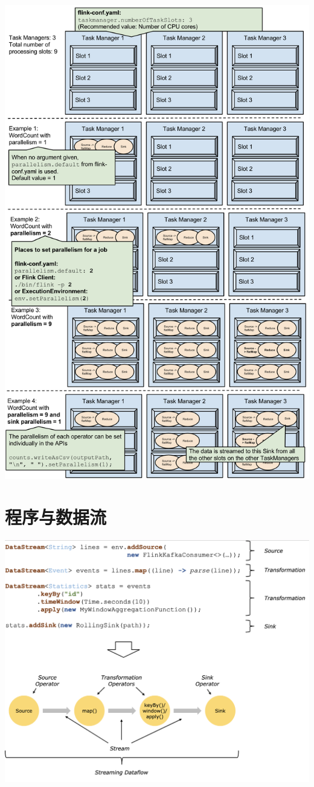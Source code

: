 \documentclass[oneside]{ctexbook}
\begin{document}
\noindent \includegraphics[width=\textwidth]{slots_parallelism.png}

\section{程序与数据流}

\noindent \includegraphics[width=\textwidth]{program_dataflow.png}
\end{document}
